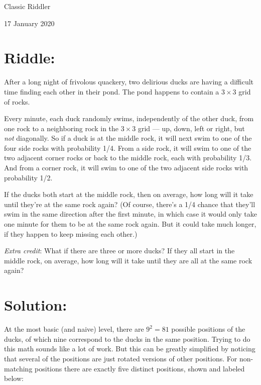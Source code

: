 \documentclass{article}
\begin{document}
\pagestyle{empty} %


\begin{center}
{\LARGE Classic Riddler}

\vspace{0.15in}

{\Large 17 January 2020}
\end{center}


\section*{Riddle:}

After a long night of frivolous quackery, two delirious ducks are having a difficult time finding each other in their pond.
The pond happens to contain a $3\times3$ grid of rocks.

Every minute, each duck randomly swims, independently of the other duck, from one rock to a neighboring rock in the $3\times3$ grid — up, down, left or right, but \textit{not} diagonally.
So if a duck is at the middle rock, it will next swim to one of the four side rocks with probability 1/4.
From a side rock, it will swim to one of the two adjacent corner rocks or back to the middle rock, each with probability 1/3.
And from a corner rock, it will swim to one of the two adjacent side rocks with probability 1/2.

If the ducks both start at the middle rock, then on average, how long will it take until they’re at the same rock again?
(Of course, there’s a 1/4 chance that they’ll swim in the same direction after the first minute, in which case it would only take one minute for them to be at the same rock again.
But it could take much longer, if they happen to keep missing each other.)

\textit{Extra credit}: What if there are three or more ducks? If they all start in the middle rock, on average, how long will it take until they are all at the same rock again?


\section*{Solution:}

At the most basic (and naive) level, there are $9^{2}=81$ possible positions of the ducks, of which nine correspond to the ducks in the same position.
Trying to do this math sounds like a lot of work.
But this can be greatly simplified by noticing that several of the positions are just rotated versions of other positions.
For non-matching positions there are exactly five distinct positions, shown and labeled below:
\end{document}

